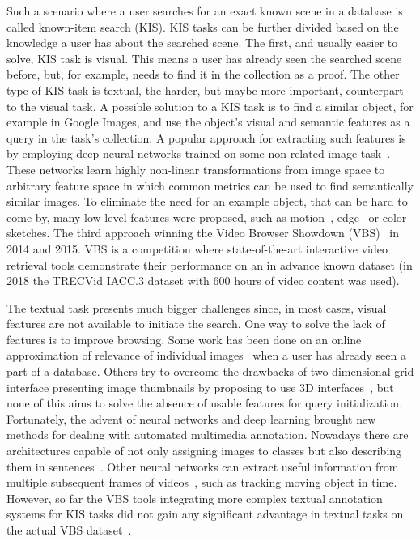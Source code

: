 Such a scenario where a user searches for an exact known scene in a database is called known-item search (KIS). KIS tasks can be further divided based on the knowledge a user has about the searched scene. The first, and usually easier to solve, KIS task is visual. This means a user has already seen the searched scene before, but, for example, needs to find it in the collection as a proof. The other type of KIS task is textual, the harder, but maybe more important, counterpart to the visual task.
A possible solution to a KIS task is to find a similar object, for example in Google Images, and use the object's visual and semantic features as a query in the task's collection. A popular approach for extracting such features is by employing deep neural networks trained on some non-related image task~\cite{deepFeatures}. These networks learn highly non-linear transformations from image space to arbitrary feature space in which common metrics can be used to find semantically similar images.
To eliminate the need for an example object, that can be hard to come by, many low-level features were proposed, such as motion~\cite{motionSketch}, edge~\cite{ITEC2} or color~\cite{sigBrowser} sketches. The third approach winning the Video Browser Showdown (VBS)~\cite{cobarzan2017interactive} in 2014 and 2015. VBS is a competition where state-of-the-art interactive video retrieval tools demonstrate their performance on an in advance known dataset (in 2018 the TRECVid IACC.3 dataset with 600 hours of video content was used).

The textual task presents much bigger challenges since, in most cases, visual features are not available to initiate the search. One way to solve the lack of features is to improve browsing. Some work has been done on an online approximation of relevance of individual images~\cite{suditu2011heat} when a user has already seen a part of a database. Others try to overcome the drawbacks of two-dimensional grid interface presenting image thumbnails by proposing to use 3D interfaces~\cite{schoeffmann20143}, but none of this aims to solve the absence of usable features for query initialization. Fortunately, the advent of neural networks and deep learning brought new methods for dealing with automated multimedia annotation. Nowadays there are architectures capable of not only assigning images to classes but also describing them in sentences~\cite{vinyals2017show}. Other neural networks can extract useful information from multiple subsequent frames of videos~\cite{bertinetto2016fully}, such as tracking moving object in time.
However, so far the VBS tools integrating more complex textual annotation systems for KIS tasks did not gain any significant advantage in textual tasks on the actual VBS dataset~\cite{Lokoc-influential-trends}.

